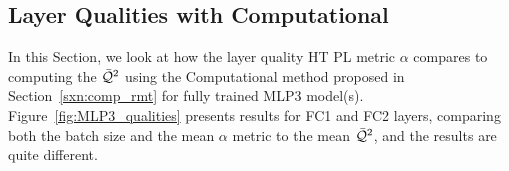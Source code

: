 \subsection{Layer Qualities with Computational \RTransforms}
\label{sxn:empirical_comp_r_transforms}

In this Section, we look at how the \HTSR layer quality HT PL metric $\alpha$
compares to computing the \LayerQualitySquared $\bar{\mathcal{Q}}^{2}$ using
the Computational \RTransform method proposed in Section~\ref{sxn:comp_rmt}
for fully trained MLP3 model(s).
Figure~\ref{fig:MLP3_qualities}
presents results for FC1 and FC2 layers, comparing
both the batch size and the mean $\alpha$ metric to the
mean $\bar{\mathcal{Q}}^{2}$, and the results are quite different.


\begin{figure}[h]
    \centering
    \hspace{1cm} %
    \hspace{1cm} %
\end{figure}
